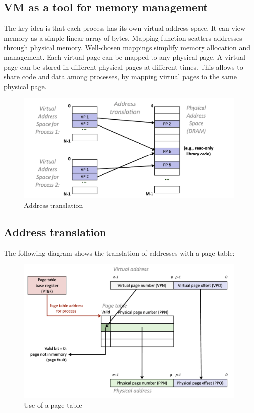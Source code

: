 \documentclass[toc]{../cs-classes/cs-classes}
\begin{document}
\subsection{VM as a tool for memory management}
The key idea is that each process has its own virtual address space. It can view memory as a simple linear array of bytes. Mapping function scatters addresses through physical memory. Well-chosen mappings simplify memory allocation and management. Each virtual page can be mapped to any physical page. A virtual page can be stored in different physical pages at different times. This allows to share code and data among processes, by mapping virtual pages to the same physical page.

\begin{figure}[!ht]
    \centering
    \includegraphics[scale=0.6]{images/address-translation.png}
    \caption{Address translation}
\end{figure}

\subsection{Address translation}
The following diagram shows the translation of addresses with a page table:
\begin{figure}[H]
    \centering
    \includegraphics[scale=0.5]{images/virtual-addressing.png}
    \caption{Use of a page table}
\end{figure}
\end{document}
